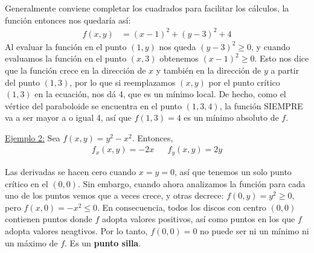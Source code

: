 \documentclass[12pt]{article}
\begin{document}
Generalmente conviene completar los cuadrados para facilitar los cálculos, la función entonces nos quedaría así:
\begin{align*}
  f(x,y) &= (x-1)^2 + (y-3)^2 + 4
\end{align*}
Al evaluar la función en el punto $ (1, y) $ nos queda $ (y-3)^2 \geq 0 $, y cuando evaluamos la función en el punto $ (x,3) $ obtenemos $ (x-1)^2 \geq 0 $. Esto nos dice que la función crece en la dirección de $ x $ y también en la dirección de $ y $ a partir del punto $ (1,3) $, por lo que si reemplazamos $ (x,y) $ por el punto crítico $ (1,3) $ en la ecuación, nos dá 4, que es un mínimo local. De hecho, como el vértice del paraboloide se encuentra en el punto $ (1,3,4) $, la función SIEMPRE va a ser mayor a o igual 4, así que $ f(1,3)=4 $ es un mínimo absoluto de $ f $.

\begin{center}
\end{center}

\underline{Ejemplo 2:} Sea $ f(x,y)=y^2-x^2 $. Entonces,
\begin{align*}
	f_{x}(x,y) = -2x && f_{y}(x,y)  = 2y
\end{align*}

Las derivadas se hacen cero cuando $ x = y = 0 $, así que tenemos un solo punto crítico en el $ (0,0) $. Sin embargo, cuando ahora analizamos la función para cada uno de los puntos vemos que a veces crece, y otras decrece: $ f(0,y)=y^2 \geq 0 $, pero $ f(x,0)=-x^2 \leq 0 $. En consecuencia, todos los discos con centro $ (0,0) $ contienen puntos donde $ f $ adopta valores positivos, así como puntos en los que $ f $ adopta valores neagtivos. Por lo tanto, $ f(0,0)=0 $ no puede ser ni un mínimo ni un máximo de $ f $. Es un \textbf{punto silla}.

\begin{center}
\end{center}
\end{document}
